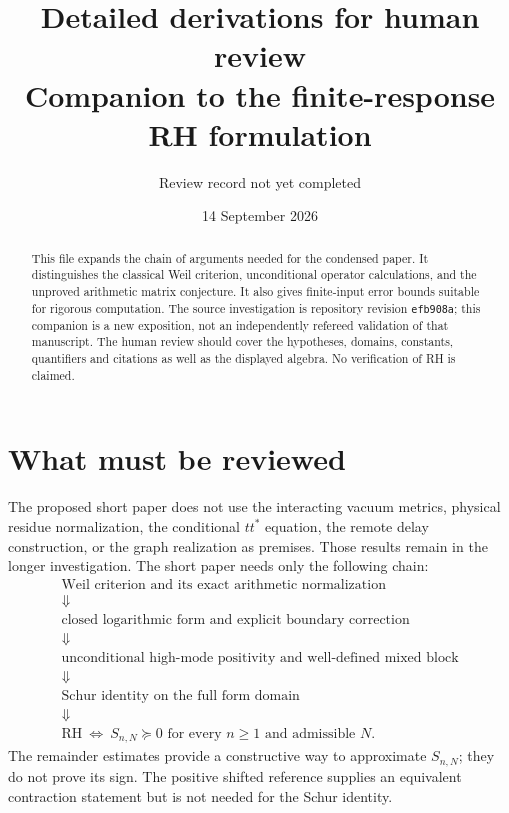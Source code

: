 
\title{Detailed derivations for human review\\\large Companion to the finite-response RH formulation}
\author{Review record not yet completed}\date{14 September 2026}
\maketitle
\begin{abstract}
This file expands the chain of arguments needed for the condensed paper.
It distinguishes the classical Weil criterion, unconditional operator
calculations, and the unproved arithmetic matrix conjecture. It also gives
finite-input error bounds suitable for rigorous computation. The source
investigation is repository revision \texttt{efb908a}; this companion is a
new exposition, not an independently refereed validation of that manuscript.
The human review should cover the hypotheses, domains, constants, quantifiers
and citations as well as the displayed algebra. No verification of RH is claimed.
\end{abstract}
\setcounter{tocdepth}{1}
\tableofcontents
\clearpage

\section{What must be reviewed}
The proposed short paper does not use the interacting vacuum metrics,
physical residue normalization, the conditional $tt^*$ equation, the remote
delay construction, or the graph realization as premises. Those results
remain in the longer investigation. The short paper needs only the following
chain:
\[
\begin{gathered}
\text{Weil criterion and its exact arithmetic normalization}\\
\Downarrow\\
\text{closed logarithmic form and explicit boundary correction}\\
\Downarrow\\
\text{unconditional high-mode positivity and well-defined mixed block}\\
\Downarrow\\
\text{Schur identity on the full form domain}\\
\Downarrow\\
\mathrm{RH}\ \Longleftrightarrow\ S_{n,N}\succeq0
\text{ for every }n\ge1\text{ and admissible }N.
\end{gathered}
\]
The remainder estimates provide a constructive way to approximate $S_{n,N}$;
they do not prove its sign. The positive shifted reference supplies an
equivalent contraction statement but is not needed for the Schur identity.

